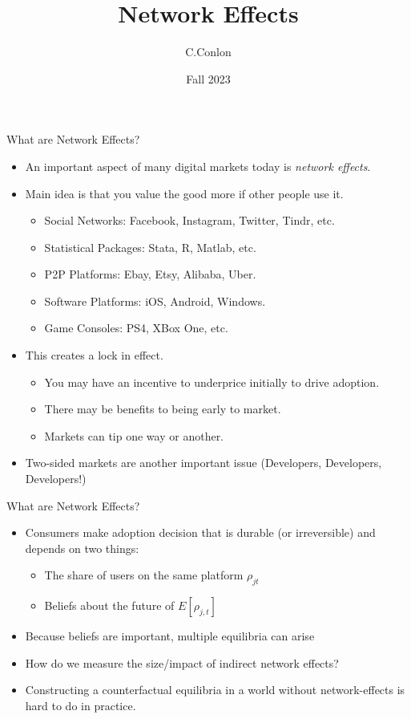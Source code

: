 \documentclass[xcolor=pdftex,dvipsnames,table,mathserif,aspectratio=169]{beamer}
\title [Dynamic Oligopoly I]{Network Effects}
\author{C.Conlon }
\institute{Grad IO }
\date{Fall 2023}
\begin{document}
\begin{frame}
\titlepage
\end{frame}

\begin{frame}{What are Network Effects?}
\begin{itemize}
\item An important aspect of many digital markets today is \textit{network effects}.
\item Main idea is that you value the good more if other people use it.
\begin{itemize}
\item Social Networks: Facebook, Instagram, Twitter, Tindr, etc.
\item Statistical Packages: Stata, R, Matlab, etc.
\item P2P Platforms: Ebay, Etsy, Alibaba, Uber.
\item Software Platforms: iOS, Android, Windows.
\item Game Consoles: PS4, XBox One, etc.
\end{itemize}
\item This creates a \alert{lock in} effect.
\begin{itemize}
\item You may have an incentive to underprice initially to drive adoption.
\item There may be benefits to being early to market.
\item Markets can \alert{tip} one way or another.
\end{itemize}
\item Two-sided markets are another important issue (Developers, Developers, Developers!) 
\end{itemize}
\end{frame}


\begin{frame}{What are Network Effects?}
\begin{itemize}
\item Consumers make adoption decision that is durable (or irreversible) and depends on two things:
\begin{itemize}
\item The share of users on the same platform $\rho_{jt}$
\item Beliefs about the future of $E[\rho_{j,t}]$
\end{itemize}
\item Because beliefs are important, multiple equilibria can arise
\item How do we measure the size/impact of indirect network effects?
\item Constructing a counterfactual equilibria in a world without network-effects is hard to do in practice.
\end{itemize}
\end{frame}
\end{document}
